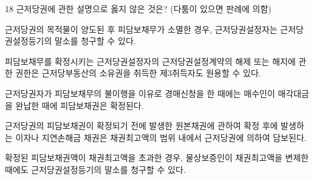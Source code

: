 \begin{question}{18}
근저당권에 관한 설명으로 옳지 않은 것은? (다툼이 있으면 판례에 의함)
\begin{choices}
  \item 근저당권의 목적물이 양도된 후 피담보채무가 소멸한 경우, 근저당권설정자는 근저당권설정등기의 말소를 청구할 수 있다.
  \item 피담보채무를 확정시키는 근저당권설정자의 근저당권설정계약의 해제 또는 해지에 관한 권한은 근저당부동산의 소유권을 취득한 제3취득자도 원용할 수 있다.
  \item 근저당권자가 피담보채무의 불이행을 이유로 경매신청을 한 때에는 매수인이 매각대금을 완납한 때에 피담보채권은 확정된다.
  \item 근저당권의 피담보채권이 확정되기 전에 발생한 원본채권에 관하여 확정 후에 발생하는 이자나 지연손해금 채권은 채권최고액의 범위 내에서 근저당권에 의하여 담보된다.
  \item 확정된 피담보채권액이 채권최고액을 초과한 경우, 물상보증인이 채권최고액을 변제한 때에도 근저당권설정등기의 말소를 청구할 수 있다.
\end{choices}
\end{question}

